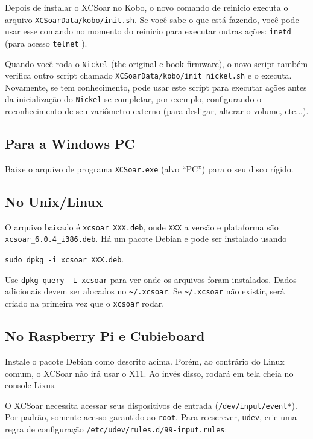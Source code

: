 Depois de instalar o XCSoar no Kobo, o novo comando de reinicio executa o arquivo \texttt{XCSoarData/kobo/init.sh}.  Se você sabe o que está fazendo, você pode usar esse comando no momento do reinicio para executar outras ações: \texttt{inetd} (para acesso \texttt{telnet}
).

Quando você roda o \texttt{Nickel} (the original e-book firmware), o novo script também verifica outro script chamado \texttt{XCSoarData/kobo/init\_nickel.sh} e o executa.  Novamente, se tem conhecimento, pode usar este script para executar ações antes da inicialização do \texttt{Nickel} se completar, por exemplo, configurando o reconhecimento de seu variômetro externo (para desligar, alterar o volume, etc...).

\subsection*{Para a Windows PC}

Baixe o arquivo de programa \verb|XCSoar.exe| (alvo ``PC'') para o seu disco rígido.

\subsection*{No Unix/Linux}

O arquivo baixado é \verb|xcsoar_XXX.deb|, onde \verb|XXX| a versão e plataforma são \verb|xcsoar_6.0.4_i386.deb|.
Há um pacote Debian e pode ser instalado usando
\begin{center}
\verb|sudo dpkg -i xcsoar_XXX.deb|.
\end{center}
Use \verb|dpkg-query -L xcsoar| para ver onde os arquivos foram instalados.  Dados adicionais devem ser alocados no \verb|~/.xcsoar|.
Se \verb|~/.xcsoar| não existir, será criado na primeira vez que o \verb|xcsoar| rodar.

\subsection*{No Raspberry Pi e Cubieboard}

Instale o pacote Debian como descrito acima.  Porém, ao contrário do Linux comum, o XCSoar não irá usar o X11.  Ao invés disso, rodará em tela cheia no console Lixus.

O XCSoar necessita acessar seus dispositivos de entrada
(\texttt{/dev/input/event*}).  Por padrão, somente acesso garantido ao \texttt{root}.  Para reescrever,  \texttt{udev}, crie uma regra de configuração \texttt{/etc/udev/rules.d/99-input.rules}:

